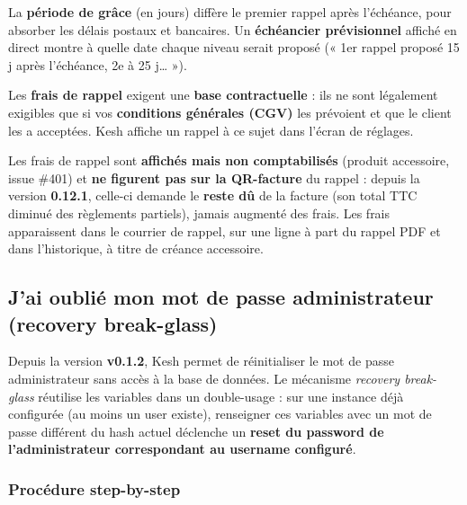 \documentclass[a4paper,11pt,oneside]{article}
\begin{document}
La \textbf{période de grâce} (en jours) diffère le premier rappel après l'échéance, pour absorber les délais postaux et bancaires. Un \textbf{échéancier prévisionnel} affiché en direct montre à quelle date chaque niveau serait proposé (« 1er rappel proposé 15 j après l'échéance, 2e à 25 j… »).

\begin{keshwarning}
Les \textbf{frais de rappel} exigent une \textbf{base contractuelle} : ils ne sont légalement exigibles que si vos \textbf{conditions générales (CGV)} les prévoient et que le client les a acceptées. Kesh affiche un rappel à ce sujet dans l'écran de réglages.
\end{keshwarning}

\begin{keshnote}
Les frais de rappel sont \textbf{affichés mais non comptabilisés} (produit accessoire, issue \#401) et \textbf{ne figurent pas sur la QR-facture} du rappel : depuis la version \textbf{0.12.1}, celle-ci demande le \textbf{reste dû} de la facture (son total TTC diminué des règlements partiels), jamais augmenté des frais. Les frais apparaissent dans le courrier de rappel, sur une ligne à part du rappel PDF et dans l'historique, à titre de créance accessoire.
\end{keshnote}

\subsection{J'ai oublié mon mot de passe administrateur (recovery break-glass)}

Depuis la version \textbf{v0.1.2}, Kesh permet de réinitialiser le mot de passe administrateur sans accès à la base de données. Le mécanisme \emph{recovery break-glass} réutilise les variables  dans un double-usage : sur une instance déjà configurée (au moins un user existe), renseigner ces variables avec un mot de passe différent du hash actuel déclenche un \textbf{reset du password de l'administrateur correspondant au username configuré}.

\subsubsection{Procédure step-by-step}
\end{document}
